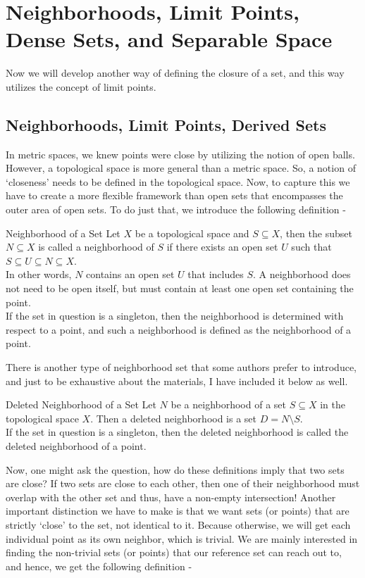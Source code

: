 \section{Neighborhoods, Limit Points, Dense Sets, and Separable Space}
Now we will develop another way of defining the closure of a set, and this way utilizes the concept of limit points.
\subsection{Neighborhoods, Limit Points, Derived Sets}
In metric spaces, we knew points were close by utilizing the notion of open balls. However, a topological space is more general than a metric space. So, a notion of `closeness' needs to be defined in the topological space. Now, to capture this we have to create a more flexible framework than open sets that encompasses the outer area of open sets. To do just that, we introduce the following definition - 
\begin{Definition}{Neighborhood of a Set}\label{neighborhood_topology}
    Let $X$ be a topological space and $S\subseteq X$, then the subset $N\subseteq X$ is called a neighborhood of $S$ if there exists an open set $U$ such that $S\subseteq U\subseteq N\subseteq X$.\\
    In other words, $N$ contains an open set $U$ that includes $S$. A neighborhood does not need to be open itself, but must contain at least one open set containing the point.\\
    If the set in question is a singleton, then the neighborhood is determined with respect to a point, and such a neighborhood is defined as the neighborhood of a point.
\end{Definition}
\noindent There is another type of neighborhood set that some authors prefer to introduce, and just to be exhaustive about the materials, I have included it below as well.
\begin{Definition}{Deleted Neighborhood of a Set}\label{deleted_neighborhood_topology}
    Let $N$ be a neighborhood of a set $S\subseteq X$ in the topological space $X$. Then a deleted neighborhood is a set $D=N\setminus S$.\\
    If the set in question is a singleton, then the deleted neighborhood is called the deleted neighborhood of a point.
\end{Definition}
\noindent Now, one might ask the question, how do these definitions imply that two sets are close? If two sets are close to each other, then one of their neighborhood must overlap with the other set and thus, have a non-empty intersection! Another important distinction we have to make is that we want sets (or points) that are strictly `close' to the set, not identical to it. Because otherwise, we will get each individual point as its own neighbor, which is trivial. We are mainly interested in finding the non-trivial sets (or points) that our reference set can reach out to, and hence, we get the following definition -
